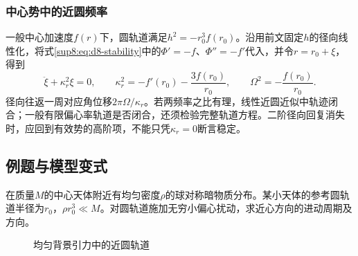 \subsubsection{中心势中的近圆频率}
一般中心加速度$f(r)$下，圆轨道满足$h^2=-r_0^3f(r_0)$。沿用前文固定$h$的径向线性化，将式\eqref{sup8:eq:d8-stability}中的$\Phi'=-f$、$\Phi''=-f'$代入，并令$r=r_0+\xi$，得到
\[
 \ddot\xi+\kappa_r^2\xi=0,\qquad
 \kappa_r^2=-f'(r_0)-\frac{3f(r_0)}{r_0},\qquad
 \Omega^2=-\frac{f(r_0)}{r_0}.
\]
径向往返一周对应角位移$2\pi\Omega/\kappa_r$。若两频率之比有理，线性近圆近似中轨迹闭合；一般有限偏心率轨道是否闭合，还须检验完整轨道方程。二阶径向回复消失时，应回到有效势的高阶项，不能只凭$\kappa_r=0$断言稳定。





\subsection{例题与模型变式}

\begin{example}[均匀暗物质导致的近圆轨道进动]\label{ex:hw8-5}

在质量$M$的中心天体附近有均匀密度$\rho$的球对称暗物质分布。某小天体的参考圆轨道半径为$r_0$，$\rho r_0^3\ll M$。对圆轨道施加无穷小偏心扰动，求近心方向的进动周期及方向。

\end{example}


\begin{figure}[H]\centering
{}
\caption{均匀背景引力中的近圆轨道}\label{fig:hw8-5-q}
\end{figure}

